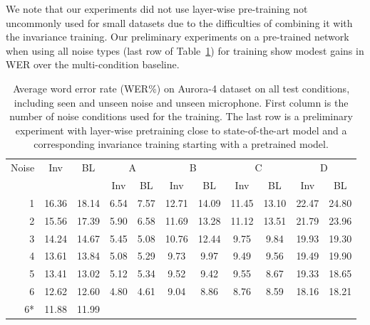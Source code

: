 \documentclass{article}
\begin{document}
We note that our experiments did not use layer-wise pre-training not uncommonly used for small
datasets due to the difficulties of combining it with the invariance training. Our preliminary
experiments on a pre-trained network when using all noise types (last row of Table~\ref{tab:results}) for training show modest gains in WER over the multi-condition baseline. 

\begin{table}
    \centering
    \caption{Average word error rate (WER\%) on Aurora-4 dataset on all test conditions,
        including seen and unseen noise and unseen microphone. First column
        is the number of noise conditions used for the training. The last row is a 
        preliminary experiment with layer-wise pretraining close to state-of-the-art
        model and a corresponding invariance training starting with a pretrained model.}
    \label{tab:results}
    \begin{tabular}{r|cc||cc|cc|cc|cc}
        Noise       &Inv&BL&  \multicolumn{2}{c|}{A} & \multicolumn{2}{c|}{B} & \multicolumn{2}{c|}{C} & \multicolumn{2}{c}{D}\\
               & & &  Inv & BL & Inv & BL & Inv & BL & Inv & BL\\
    \hline
    1           &16.36        &18.14 &6.54&7.57    &12.71& 14.09   & 11.45&   13.10    & 22.47 &   24.80    \\
    2           &15.56        &17.39 &5.90&  6.58 &   11.69   &13.28   &11.12   &13.51   &21.79   &23.96 \\
    3           &14.24        &14.67 &5.45 & 5.08&    10.76&   12.44&   9.75&    9.84 &   19.93&   19.30\\
    4           &13.61        &13.84 & 5.08 &5.29    &9.73    &9.97    &9.49    &9.56    &19.49   &19.90\\         
    5           &13.41        &13.02 & 5.12 &5.34    &9.52    &9.42    &9.55    &8.67    &19.33   &18.65\\         
    6           &12.62        &12.60 & 4.80 &4.61    &9.04    &8.86    &8.76    &8.59    &18.16   &18.21\\
    \hline\hline
    6* &11.88        &11.99
    \end{tabular}
\end{table}
\end{document}
